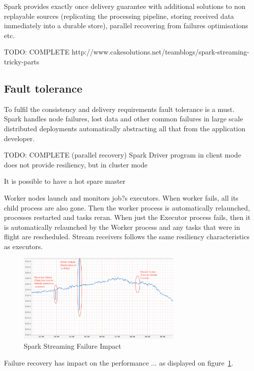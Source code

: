 \documentclass[a4paper, 10 pt, conference]{IEEEtran}
\begin{document}
Spark provides exactly once delivery guarantee with additional solutions to non replayable sources (replicating the processing pipeline, storing received data immediately into a durable store), parallel recovering from failures optimisations etc.

TODO: COMPLETE http://www.cakesolutions.net/teamblogs/spark-streaming-tricky-parts

\subsection{Fault tolerance}
To fulfil the consistency and delivery requirements fault tolerance is a must. Spark handles node failures, lost data and other common failures in large scale distributed deployments automatically abstracting all that from the application developer.

TODO: COMPLETE (parallel recovery)
Spark Driver program in client mode does not provide resiliency, but in cluster mode 

It is possible to have a hot spare master 

Worker nodes launch and monitors job?s executors. When worker fails, all its child process are also gone. Then the worker process is automatically relaunched, processes restarted and tasks reran. When just the Executor process fails, then it is automatically relaunched by the Worker process and any tasks that were in flight are rescheduled. Stream receivers follows the same resiliency characteristics as 
executors.

\begin{figure}[hb]
	\begin{center}
		\caption{Spark Streaming Failure Impact}
		\label{fig:sparkStreamingFailureImpact}
		\includegraphics[width=8cm,keepaspectratio]{spark-streaming-failure-impact.png}
	\end{center}
\end{figure}

Failure recovery has impact on the performance ... as displayed on figure~\ref{fig:sparkStreamingFailureImpact}.
\end{document}
